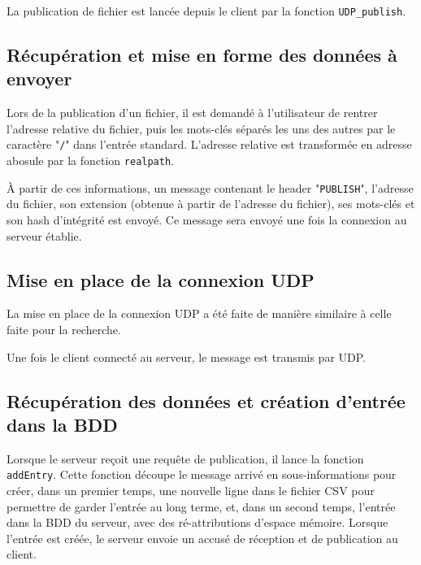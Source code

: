 La publication de fichier est lancée depuis le client par la fonction \verb|UDP_publish|.


\subsection{Récupération et mise en forme des données à envoyer}
Lors de la publication d'un fichier, il est demandé à l'utilisateur de rentrer l'adresse relative du fichier, puis les mots-clés séparés les uns des autres par le caractère "\verb|/|" dans l'entrée standard. L'adresse relative est transformée en adresse abosule par la fonction \verb|realpath|.
\vskip 0.25cm


À partir de ces informations, un message contenant le header "\verb|PUBLISH|", l'adresse du fichier, son extension (obtenue à partir de l'adresse du fichier), ses mots-clés et son hash d'intégrité est envoyé. Ce message sera envoyé une fois la connexion au serveur établie.

\subsection{Mise en place de la connexion UDP}
La mise en place de la connexion UDP a été faite de manière similaire à celle faite pour la recherche.
\vskip 0.25cm

Une fois le client connecté au serveur, le message est transmis par UDP.

\subsection{Récupération des données et création d'entrée dans la BDD}
Lorsque le serveur reçoit une requête de publication, il lance la fonction \verb|addEntry|. Cette fonction découpe le message arrivé en sous-informations pour créer, dans un premier temps, une nouvelle ligne dans le fichier CSV pour permettre de garder l'entrée au long terme, et, dans un second temps, l'entrée dans la BDD du serveur, avec des ré-attributions d'espace mémoire.
\vskip 0.25cm
Lorsque l'entrée est créée, le serveur envoie un accusé de réception et de publication au client.